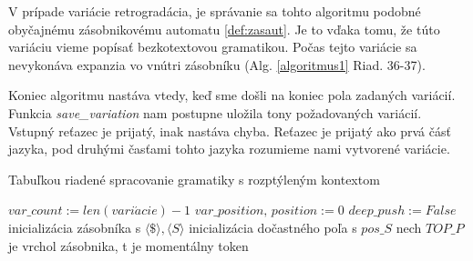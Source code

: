 V prípade variácie retrogradácia, je správanie sa tohto algoritmu podobné obyčajnému zásobnikovému automatu \ref{def:zasaut}. Je to vďaka tomu, že túto variáciu vieme popísať bezkotextovou gramatikou. Počas tejto variácie sa nevykonáva expanzia vo vnútri zásobníku (Alg. \ref{algoritmus1} Riad. 36-37).

Koniec algoritmu nastáva vtedy, keď sme došli na koniec pola zadaných variácií. Funkcia \textit{save\_variation} nam postupne uložila tony požadovaných variácií. Vstupný reťazec je prijatý, inak nastáva chyba. Reťazec je prijatý ako prvá čásť jazyka, pod druhými časťami tohto jazyka rozumieme nami vytvorené variácie.

\begin{algorithm}
\label{algoritmus1}
\SetNlSkip{-1em}
\caption{Tabuľkou riadené spracovanie gramatiky s rozptýleným kontextom}
\SetNlSty{}{}{:}
\SetStartEndCondition{ }{}{}%
%
%
%
\AlgoDontDisplayBlockMarkers\SetAlgoNoEnd\SetAlgoNoLine%
\Indp
\Indpp
\medskip
$var\_count := len(vari\acute{a}cie) - 1$\;
$var\_position,\, position := 0$\;
$deep\_push := False$\;
inicializácia zásobníka s $\langle \$ \rangle, \langle S \rangle$\;
inicializácia dočastného poľa s $pos\_S$\;
     {
        nech $TOP\_P$ je vrchol zásobnika, t je momentálny token\;
    }
\end{algorithm}

